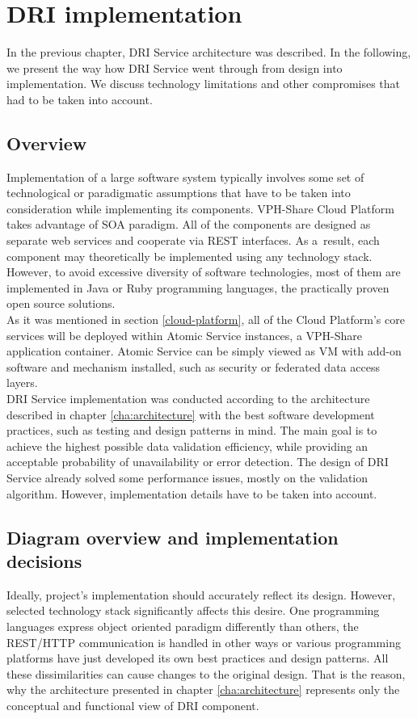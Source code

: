 \chapter{DRI implementation}
\label{cha:implementation}
In the previous chapter, DRI Service architecture was described. In the
following, we present the way how DRI Service went through from design into
implementation. We discuss technology limitations and other compromises that
had to be taken into account.

	\section{Overview}
Implementation of a large software system typically involves some set of
technological or paradigmatic assumptions that have to be taken into
consideration while implementing its components. VPH-Share Cloud Platform takes
advantage of SOA paradigm. All of the components are designed as separate web
services and cooperate via REST interfaces. As a~result, each component may
theoretically be implemented using any technology stack. However, to avoid
excessive diversity of software technologies, most of them are implemented in
Java or Ruby programming languages, the practically proven open source
solutions.\\

As it was mentioned in section \ref{cloud-platform}, all of the Cloud
Platform's core services will be deployed within Atomic Service instances,
a VPH-Share application container. Atomic Service can be simply viewed as VM
with add-on software and mechanism installed, such as security or federated
data access layers.\\

DRI Service implementation was conducted according to the architecture
described in chapter \ref{cha:architecture} with the best software development
practices, such as testing and design patterns in mind. The main goal is to
achieve the highest possible data validation efficiency, while providing an
acceptable probability of unavailability or error detection. The design of DRI
Service already solved some performance issues, mostly on the validation
algorithm. However, implementation details have to be taken into account.
	
	\section{Diagram overview and implementation decisions}
Ideally, project's implementation should accurately reflect its design.
However, selected technology stack significantly affects this desire. One
programming languages express object oriented paradigm differently than
others, the REST/HTTP communication is handled in other ways or various
programming platforms have just developed its own best practices and design
patterns. All these dissimilarities can cause changes to the original design.
That is the reason, why the architecture presented in chapter
\ref{cha:architecture} represents only the conceptual and functional view of
DRI component.

